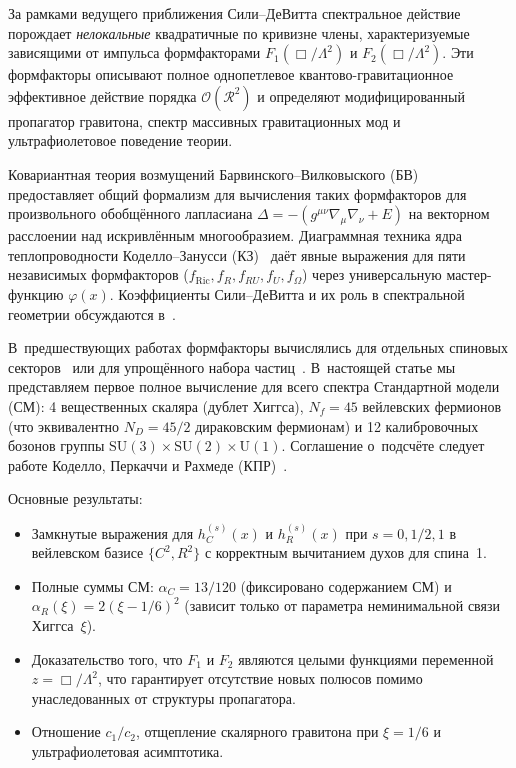 \documentclass[12pt,a4paper]{article}
\begin{document}
За рамками ведущего приближения Сили--ДеВитта спектральное действие порождает
\emph{нелокальные} квадратичные по кривизне члены, характеризуемые зависящими
от импульса формфакторами $F_1(\Box/\Lambda^2)$ и $F_2(\Box/\Lambda^2)$. Эти
формфакторы описывают полное однопетлевое квантово-гравитационное эффективное
действие порядка $\mathcal{O}(\mathcal{R}^2)$ и определяют модифицированный
пропагатор гравитона, спектр массивных гравитационных мод и ультрафиолетовое
поведение теории.

Ковариантная теория возмущений Барвинского--Вилковыского
(БВ)~\cite{Barvinsky:1985an,Barvinsky:1987uw} предоставляет общий формализм
для вычисления таких формфакторов для произвольного обобщённого лапласиана
$\Delta = -(g^{\mu\nu}\nabla_\mu\nabla_\nu + E)$ на векторном расслоении над
искривлённым многообразием. Диаграммная техника ядра теплопроводности
Коделло--Занусси (КЗ)~\cite{Codello:2012kq} даёт явные выражения для пяти
независимых формфакторов ($f_{\text{Ric}}, f_R, f_{RU}, f_U, f_\Omega$)
через универсальную мастер-функцию $\varphi(x)$. Коэффициенты Сили--ДеВитта
и их роль в спектральной геометрии обсуждаются
в~\cite{DeWitt:1964mxt,Gilkey:1975iq,Vassilevich:2003xt,Avramidi:2000bm,Fursaev:2011zz}.

В~предшествующих работах формфакторы вычислялись для отдельных спиновых
секторов~\cite{Barvinsky:1987uw,Codello:2012kq} или для упрощённого набора
частиц~\cite{Codello:2008vh}. В~настоящей статье мы представляем первое полное
вычисление для всего спектра Стандартной модели (СМ): 4 вещественных скаляра
(дублет Хиггса), $N_f = 45$ вейлевских фермионов (что эквивалентно
$N_D = 45/2$ дираковским фермионам) и 12 калибровочных бозонов группы
$\mathrm{SU}(3) \times \mathrm{SU}(2) \times \mathrm{U}(1)$. Соглашение
о~подсчёте следует работе Коделло, Перкаччи и Рахмеде
(КПР)~\cite{Codello:2008vh}.

Основные результаты:
\begin{itemize}
\item Замкнутые выражения для $h_C^{(s)}(x)$ и $h_R^{(s)}(x)$ при
  $s = 0, 1/2, 1$ в вейлевском базисе $\{C^2, R^2\}$ с корректным вычитанием
  духов для спина~1.
\item Полные суммы СМ: $\alpha_C = 13/120$ (фиксировано содержанием СМ) и
  $\alpha_R(\xi) = 2(\xi - 1/6)^2$ (зависит только от параметра неминимальной
  связи Хиггса~$\xi$).
\item Доказательство того, что $F_1$ и $F_2$ являются целыми функциями
  переменной $z = \Box/\Lambda^2$, что гарантирует отсутствие новых полюсов
  помимо унаследованных от структуры пропагатора.
\item Отношение $c_1/c_2$, отщепление скалярного гравитона при $\xi = 1/6$
  и ультрафиолетовая асимптотика.
\end{itemize}
\end{document}
